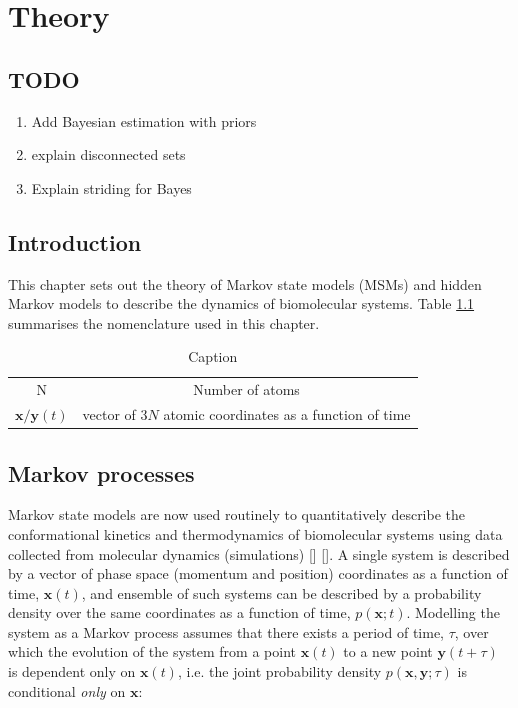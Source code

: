 %
\let\textcircled=\pgftextcircled
\chapter{Theory}
\label{chap:theory}

\section{TODO}
\begin{enumerate}
    \item Add Bayesian estimation with priors
    \item explain disconnected sets
    \item Explain striding for Bayes
\end{enumerate}



\section{Introduction}
This chapter sets out the theory of Markov state models (MSMs) and hidden Markov models to describe the dynamics of biomolecular systems. Table \ref{tab:theory_nomenclature} summarises the  nomenclature used in this chapter. 

\begin{table}
    \centering
    \begin{tabular}{c|c}
        N & Number of atoms \\
        $\mathbf{x}/\mathbf{y}(t)$ & vector of $3N$ atomic coordinates as a function of time \\
        
        
    \end{tabular}
    \caption{Caption}
    \label{tab:theory_nomenclature}
\end{table}


\section{Markov processes}

Markov state models are now used routinely to quantitatively describe the conformational kinetics and thermodynamics of biomolecular systems using data collected from molecular dynamics (simulations) [] []. A single system is described by a vector of phase space (momentum and position) coordinates as a function of time, $\mathbf{x}(t)$, and ensemble of such systems can be described by a probability density over the same coordinates as a function of time, $p(\mathbf{x}; t)$. Modelling the system as a Markov process assumes that there exists a period of time, $\tau$, over which the evolution of the system from a point $\mathbf{x}(t)$ to a new point $\mathbf{y}(t+\tau)$ is dependent only on $\mathbf{x}(t)$, i.e. the joint probability density $p(\mathbf{x}, \mathbf{y} ; \tau)$ is conditional \emph{only} on $\mathbf{x}$:

